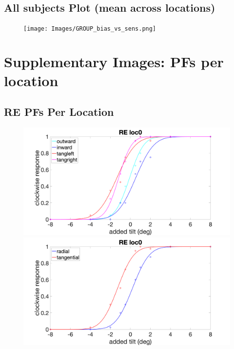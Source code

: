 \documentclass[11pt]{article} %
\begin{document}
\subsection{All subjects Plot (mean across locations)}
\begin{figure}[H]
\centering %
\texttt{[image: Images/GROUP\_bias\_vs\_sens.png]}
\end{figure}

\newpage
\section{Supplementary Images: PFs per location}
\subsection{RE PFs Per Location}
\begin{figure}[H]
\centering %
\includegraphics[scale=.15]{Images/RE_PF_loc0_4conds.png}
\includegraphics[scale=.15]{Images/RE_PF_loc0_2conds.png}
\end{figure}
\end{document}
